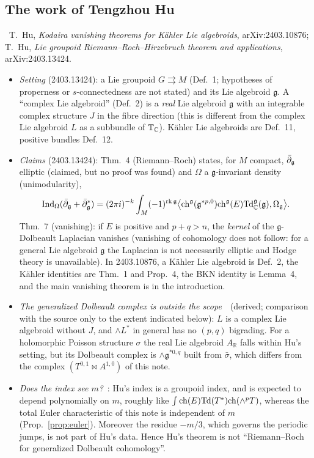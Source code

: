 \subsection{The work of Tengzhou Hu}
\tC\ T.\ Hu, \emph{Kodaira vanishing theorems for K\"ahler Lie algebroids}, arXiv:2403.10876;\\ T.\ Hu, \emph{Lie groupoid Riemann--Roch--Hirzebruch theorem and applications}, arXiv:2403.13424.
\begin{itemize}
\item \emph{Setting} (2403.13424): a Lie groupoid $G\rightrightarrows M$ (Def.~1; hypotheses of properness or $s$-connectedness are not stated) and its Lie algebroid $\mathfrak g$. A ``complex Lie algebroid'' (Def.~2) is a \emph{real} Lie algebroid $\mathfrak g$ with an integrable complex structure $J$ in the fibre direction (this is different from the complex Lie algebroid $L$ as a subbundle of $\mathbb T_\mathbb C$). Kähler Lie algebroids are Def.~11, positive bundles Def.~12.
\item \emph{Claims} (2403.13424): Thm.~4 (Riemann--Roch) states, for $M$ compact, $\bar\partial_{\mathfrak g}$ elliptic (claimed, but no proof was found) and $\Omega$ a $\mathfrak g$-invariant density (unimodularity),
\[\mathrm{Ind}_\Omega(\bar\partial_{\mathfrak g}+\bar\partial_{\mathfrak g}^*)=(2\pi i)^{-k}\int_M(-1)^{\mathrm{rk}\,\mathfrak g}\bigl\langle\mathrm{ch}^{\mathfrak g}(\mathfrak g^{*p,0})\mathrm{ch}^{\mathfrak g}(E)\mathrm{Td}^{\mathfrak g}_\mathbb C(\mathfrak g),\Omega_{\mathfrak g}\bigr\rangle.\]
Thm.~7 (vanishing): if $E$ is positive and $p+q>n$, the \emph{kernel} of the $\mathfrak g$-Dolbeault Laplacian vanishes (vanishing of cohomology does not follow: for a general Lie algebroid $\mathfrak g$ the Laplacian is not necessarily elliptic and Hodge theory is unavailable). In 2403.10876, a K\"ahler Lie algebroid is Def.~2, the K\"ahler identities are Thm.~1 and Prop.~4, the BKN identity is Lemma~4, and the main vanishing theorem is in the introduction.
\item \emph{The generalized Dolbeault complex is outside the scope}\ \tP\ (derived; comparison with the source only to the extent indicated below): $L$ is a complex Lie algebroid without $J$, and $\wedge L^*$ in general has no $(p,q)$ bigrading. For a holomorphic Poisson structure $\sigma$ the real Lie algebroid $A_{\mathbb R}$ falls within Hu's setting, but its Dolbeault complex is $\wedge\mathfrak g^{*0,q}$ built from $\bar\sigma$, which differs from the complex $(T^{0,1}\bowtie A^{1,0})$ of this note.
\item \emph{Does the index see $m$?}\ \tK: Hu's index is a groupoid index, and is expected to depend polynomially on $m$, roughly like $\int\mathrm{ch}(E)\mathrm{Td}(T^*)\mathrm{ch}(\wedge^pT)$, whereas the total Euler characteristic of this note is independent of $m$ (Prop.~\ref{prop:euler}). Moreover the residue $-m/3$, which governs the periodic jumps, is not part of Hu's data. Hence Hu's theorem is not ``Riemann--Roch for generalized Dolbeault cohomology''.

\end{itemize}

